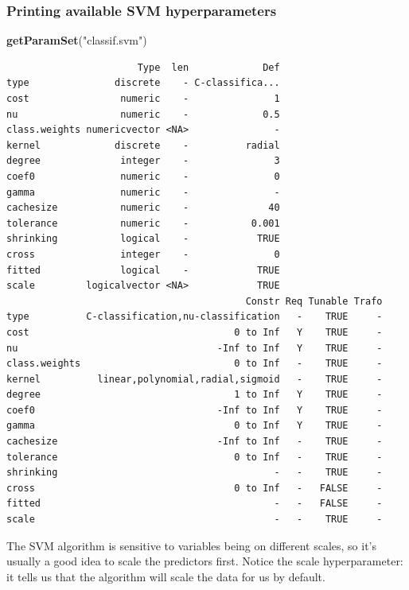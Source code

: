 \documentclass[
]{article}
\newenvironment{Shaded}{\begin{snugshade}}{\end{snugshade}}
\newcommand{\FunctionTok}[1]{\textcolor[rgb]{0.13,0.29,0.53}{\textbf{#1}}}
\newcommand{\NormalTok}[1]{#1}
\newcommand{\StringTok}[1]{\textcolor[rgb]{0.31,0.60,0.02}{#1}}
\begin{document}
\subsubsection{Printing available SVM
hyperparameters}\label{printing-available-svm-hyperparameters}

\begin{Shaded}
\begin{Highlighting}[]
\FunctionTok{getParamSet}\NormalTok{(}\StringTok{"classif.svm"}\NormalTok{)}
\end{Highlighting}
\end{Shaded}

\begin{verbatim}
                       Type  len             Def
type               discrete    - C-classifica...
cost                numeric    -               1
nu                  numeric    -             0.5
class.weights numericvector <NA>               -
kernel             discrete    -          radial
degree              integer    -               3
coef0               numeric    -               0
gamma               numeric    -               -
cachesize           numeric    -              40
tolerance           numeric    -           0.001
shrinking           logical    -            TRUE
cross               integer    -               0
fitted              logical    -            TRUE
scale         logicalvector <NA>            TRUE
                                          Constr Req Tunable Trafo
type          C-classification,nu-classification   -    TRUE     -
cost                                    0 to Inf   Y    TRUE     -
nu                                   -Inf to Inf   Y    TRUE     -
class.weights                           0 to Inf   -    TRUE     -
kernel          linear,polynomial,radial,sigmoid   -    TRUE     -
degree                                  1 to Inf   Y    TRUE     -
coef0                                -Inf to Inf   Y    TRUE     -
gamma                                   0 to Inf   Y    TRUE     -
cachesize                            -Inf to Inf   -    TRUE     -
tolerance                               0 to Inf   -    TRUE     -
shrinking                                      -   -    TRUE     -
cross                                   0 to Inf   -   FALSE     -
fitted                                         -   -   FALSE     -
scale                                          -   -    TRUE     -
\end{verbatim}

The SVM algorithm is sensitive to variables being on different scales,
so it's usually a good idea to scale the predictors first. Notice the
scale hyperparameter: it tells us that the algorithm will scale the data
for us by default.
\end{document}
